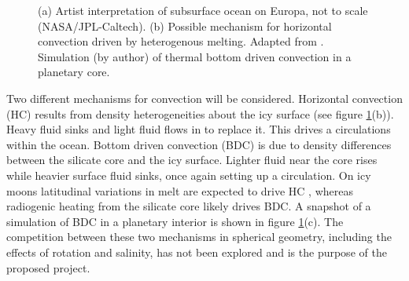 \documentclass[12pt]{article}
\begin{document}
\begin{figure}[H]
	\begin{center}
		\quad
	\end{center}
	\caption{(a) Artist interpretation of subsurface ocean on Europa, not to scale (NASA/JPL-Caltech). (b) Possible mechanism for horizontal convection driven by heterogenous melting. Adapted from \citep{wK22}. Simulation (by author) of thermal bottom driven convection in a planetary core\citep{tO25}.}
	\label{f:pic}
\end{figure}

Two different mechanisms for convection will be considered.
Horizontal convection (HC) results from density heterogeneities about the icy surface (see figure \ref{f:pic}(b)). Heavy fluid sinks and light fluid flows in to replace it. This drives a circulations within the ocean. Bottom driven convection (BDC) is due to density differences between the silicate core and the icy surface. Lighter fluid near the core rises while heavier surface fluid sinks, once again setting up a circulation. 
On icy moons latitudinal variations in melt are expected to drive HC \citep{wK22}, whereas radiogenic heating from the silicate core \citep{kS14,kS19,jK22} likely drives BDC. A snapshot of a simulation of BDC in a planetary interior is shown in figure \ref{f:pic}(c)\citep{tO25}. 
The competition between these two mechanisms in spherical geometry, including the effects of rotation and salinity, has not been explored and is the purpose of the proposed project.
\end{document}
